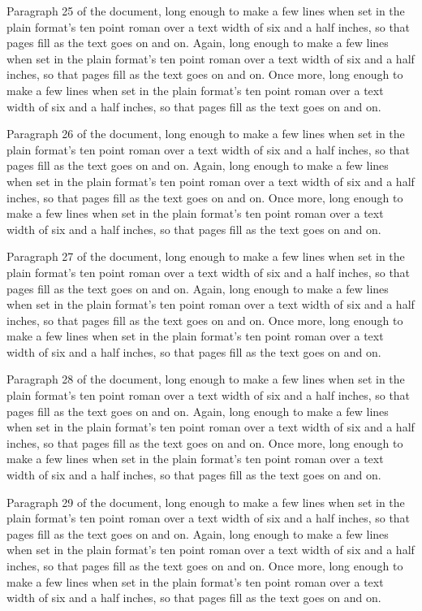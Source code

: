 Paragraph 25 of the document, long enough to make a few lines when set in the plain format's ten point roman over a text width of six and a half inches, so that pages fill as the text goes on and on. Again, long enough to make a few lines when set in the plain format's ten point roman over a text width of six and a half inches, so that pages fill as the text goes on and on. Once more, long enough to make a few lines when set in the plain format's ten point roman over a text width of six and a half inches, so that pages fill as the text goes on and on.

Paragraph 26 of the document, long enough to make a few lines when set in the plain format's ten point roman over a text width of six and a half inches, so that pages fill as the text goes on and on. Again, long enough to make a few lines when set in the plain format's ten point roman over a text width of six and a half inches, so that pages fill as the text goes on and on. Once more, long enough to make a few lines when set in the plain format's ten point roman over a text width of six and a half inches, so that pages fill as the text goes on and on.

Paragraph 27 of the document, long enough to make a few lines when set in the plain format's ten point roman over a text width of six and a half inches, so that pages fill as the text goes on and on. Again, long enough to make a few lines when set in the plain format's ten point roman over a text width of six and a half inches, so that pages fill as the text goes on and on. Once more, long enough to make a few lines when set in the plain format's ten point roman over a text width of six and a half inches, so that pages fill as the text goes on and on.

Paragraph 28 of the document, long enough to make a few lines when set in the plain format's ten point roman over a text width of six and a half inches, so that pages fill as the text goes on and on. Again, long enough to make a few lines when set in the plain format's ten point roman over a text width of six and a half inches, so that pages fill as the text goes on and on. Once more, long enough to make a few lines when set in the plain format's ten point roman over a text width of six and a half inches, so that pages fill as the text goes on and on.

Paragraph 29 of the document, long enough to make a few lines when set in the plain format's ten point roman over a text width of six and a half inches, so that pages fill as the text goes on and on. Again, long enough to make a few lines when set in the plain format's ten point roman over a text width of six and a half inches, so that pages fill as the text goes on and on. Once more, long enough to make a few lines when set in the plain format's ten point roman over a text width of six and a half inches, so that pages fill as the text goes on and on.

